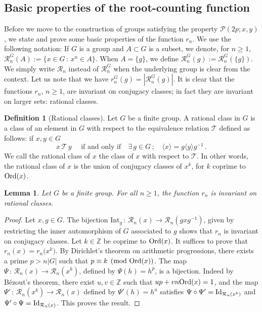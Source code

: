 \documentclass[12pt]{amsart}
\numberwithin{equation}{section}
\newcommand{\Ord}{{\rm Ord}}
\newcommand{\Id}{{\rm Id}}
\newcommand{\Z}{\mathbb Z}
\newtheorem{lem}[X]{Lemma}
\theoremstyle{definition}
\newtheorem{defi}[X]{Definition}
\theoremstyle{remark}
\begin{document}
\subsection{Basic properties of the root-counting function}
Before we move to the construction of groups satisfying the property $\mathcal{P}(2p;x,y)$, we state and prove some basic properties of the function $r_n$. We use the following notation: If $G$ is a group and $A\subset G$ is a subset, we denote, for $n\ge1$, $\mathcal{R}_n^G(A):=\{x\in G\, \colon\,  x^n\in A\}$. When $A=\{g\}$, we define $\mathcal{R}_n^G(g):=\mathcal{R}_n^G(\{g\})$. We simply write $\mathcal{R}_n$ instead of $\mathcal{R}_n^G$ when the underlying group is clear from the context. Let us note that we have $r_n^G(g)=|\mathcal{R}_n^G(g)|$. 
It is clear that the functions $r_n$, $n\ge1$, are invariant on conjugacy classes; in fact they are invariant on larger sets: rational classes.
\begin{defi}[Rational classes]
    Let $G$ be a finite group. A rational class in $G$ is a class of an element in $G$ with respect to the equivalence relation $\mathcal{T}$ defined as follows: if $x,y\in G$
    \[x\, \mathcal{T}\,y \quad\text{ if and only if}\quad \exists\, g\in G\, ; \quad \langle x\rangle=g\langle y\rangle g^{-1}\, .\]
    We call the rational class of $x$ the class of $x$ with respect to $\mathcal{T}$. In other words, the rational class of $x$ is the union of conjugacy classes of $x^k $, for $k$ coprime to $\Ord(x)$.
\end{defi}
\begin{lem}\label{rational-classes}
    Let $G$ be a finite group. For all $n\ge 1$, the function $r_n$ is invariant on rational classes.
\end{lem}
\begin{proof}
    Let $x,g\in G$. The bijection $\mathrm{Int}_g\, \colon\,  \mathcal{R}_n(x)\to \mathcal{R}_n(g x g^{-1})$, given by restricting the inner automorphism of $G$ associated to $g$ shows that $r_n$ is invariant on conjugacy classes. Let $k\in \Z$ be coprime to $\Ord(x)$. It suffices to prove that $r_n(x)=r_n\bigl(x^k\bigr)$. By Dirichlet's theorem on arithmetic progressions, there exists a prime $p>n|G|$ such that $p\equiv k\pmod{\Ord(x)}$. The map $\Psi\, \colon\,  \mathcal{R}_n(x)\to\mathcal{R}_n(x^k)$, defined by $\Psi(h)=h^p$, is a bijection. Indeed by Bézout's theorem, there exist $u,v\in \Z$ such that $up+vn\Ord(x)=1$, and the map $\Psi'\, \colon\,  \mathcal{R}_n(x^k)\to \mathcal{R}_n(x)$ defined by $\Psi'(h)=h^u$ satisfies $\Psi\circ\Psi'=\Id_{\mathcal{R}_n(x^k)}$ and $\Psi'\circ \Psi=\Id_{\mathcal{R}_n(x)}$. This proves the result. 
\end{proof}
\end{document}
